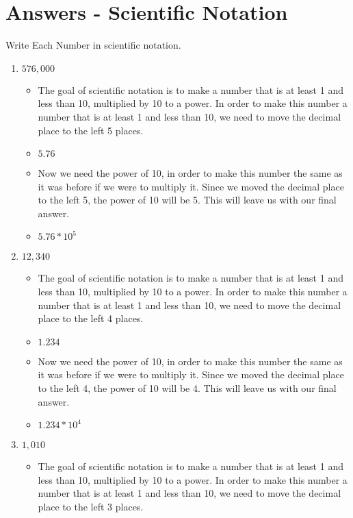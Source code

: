 \section{Answers - Scientific Notation}
Write Each Number in scientific notation.
\begin{enumerate}
\item $576,000$
  \begin{itemize}
  \item The goal of scientific notation is to make a number that is at least 1 and less than 10, multiplied by 10 to a power. In order to make this number a number that is at least 1 and less than 10, we need to move the decimal place to the left 5 places.
  \item [] $5.76$
  \item [] Now we need the power of 10, in order to make this number the same as it was before if we were to multiply it. Since we moved the decimal place to the left 5, the power of 10 will be 5. This will leave us with our final answer.
  \item $5.76 *10^{5}$
  \end{itemize}
\item $12,340$
  \begin{itemize}
  \item The goal of scientific notation is to make a number that is at least 1 and less than 10, multiplied by 10 to a power. In order to make this number a number that is at least 1 and less than 10, we need to move the decimal place to the left 4 places.
  \item [] $1.234$
  \item [] Now we need the power of 10, in order to make this number the same as it was before if we were to multiply it. Since we moved the decimal place to the left 4, the power of 10 will be 4. This will leave us with our final answer.
  \item $1.234 *10^{4}$
  \end{itemize}
\item $1,010$
  \begin{itemize}
  \item The goal of scientific notation is to make a number that is at least 1 and less than 10, multiplied by 10 to a power. In order to make this number a number that is at least 1 and less than 10, we need to move the decimal place to the left 3 places.

\end{itemize}
\end{enumerate}
